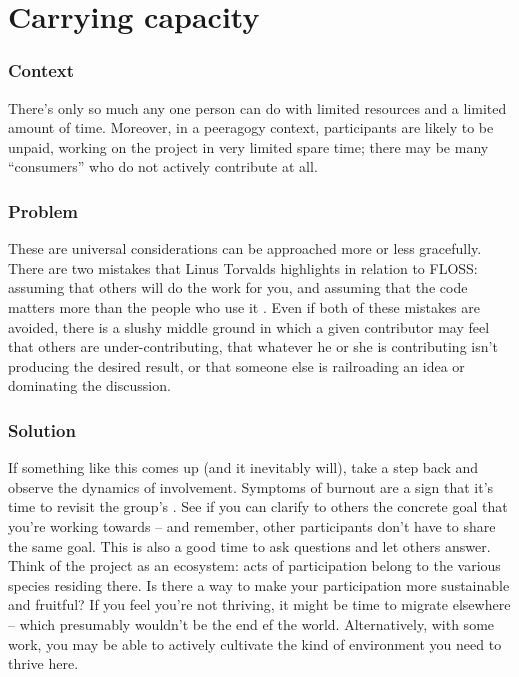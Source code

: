 \begingroup \color{OliveGreen}

\section{Carrying capacity}\label{sec:Carrying_capacity}
\subsubsection*{Context} There's only so much any one person can do with
limited resources and a limited amount of time.  Moreover, in a
peeragogy context, participants are likely to be unpaid, working on
the project in very limited spare time; there may be many
``consumers'' who do not actively contribute at all.


\subsubsection*{Problem} These are universal considerations can
be approached more or less gracefully.  There are two mistakes that
Linus Torvalds highlights in relation to FLOSS: assuming that others
will do the work for you, and assuming that the code matters more than
the people who use it \cite{torvalds-interview}.  Even if both of these mistakes are avoided,
there is a slushy middle ground in which a given contributor may feel
that others are under-contributing, that whatever he or she is
contributing isn't producing the desired result, or that someone else
is railroading an idea or dominating the discussion.

\subsubsection*{Solution} If something like this comes up (and it inevitably will),
take a step back and observe the dynamics of involvement.  Symptoms of
burnout are a sign that it's time to revisit the group's
.  See if you can clarify to others the concrete
goal that you're working towards -- and remember, other participants
don't have to share the same goal.  This is also a good time to ask
questions and let others answer.  Think of the project as an
ecosystem: acts of participation belong to the various species
residing there.  Is there a way to make your participation more
sustainable and fruitful?  If you feel you're not thriving, it might
be time to migrate elsewhere -- which presumably wouldn't be the end
ef the world.  Alternatively, with some work, you may be able to
actively cultivate the kind of environment you need to thrive here.

